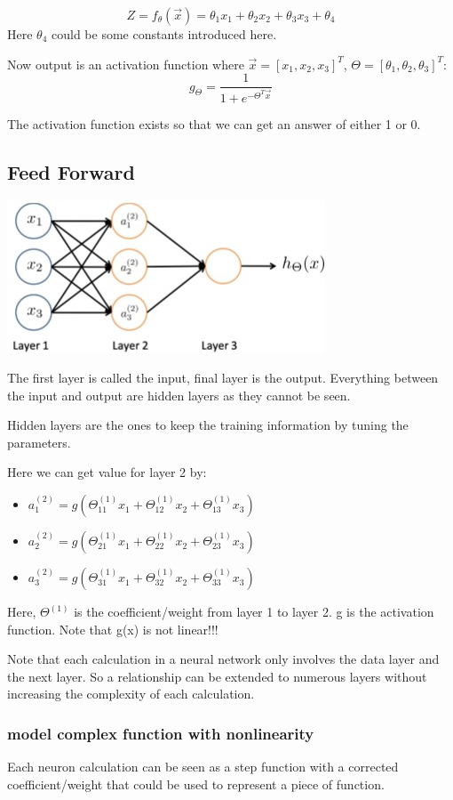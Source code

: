 \documentclass[letterpaper,12pt]{article}
\begin{document}
\[Z=f_\theta(\vec{x})=\theta_1 x_1 + \theta_2 x_2 + \theta_3 x_3 + \theta_4\]
Here $\theta_4$ could be some constants introduced here. 

Now output is an activation function where $\vec{x}=[x_1,x_2,x_3]^T$, $\Theta=[\theta_1,\theta_2, \theta_3]^T$:
\[g_\Theta=\frac{1}{1+e^{-\Theta^T \vec{x}}}\]

The activation function exists so that we can get an answer of either 1 or 0. 

\subsection{Feed Forward}
\includegraphics*{./Image/Feed Forward Nonliearity.jpg}

The first layer is called the input, final layer is the output. Everything between the input and output are hidden layers as they cannot be seen.

Hidden layers are the ones to keep the training information by tuning the parameters. 

Here we can get value for layer 2 by:
\begin{itemize}
    \item $a_1^{(2)} = g(\Theta_{11}^{(1)}x_1+\Theta_{12}^{(1)}x_2+\Theta_{13}^{(1)}x_3)$
    \item $a_2^{(2)} = g(\Theta_{21}^{(1)}x_1+\Theta_{22}^{(1)}x_2+\Theta_{23}^{(1)}x_3)$
    \item $a_3^{(2)} = g(\Theta_{31}^{(1)}x_1+\Theta_{32}^{(1)}x_2+\Theta_{33}^{(1)}x_3)$
\end{itemize}

Here, $\Theta^{(1)}$ is the coefficient/weight from layer 1 to layer 2. g is the activation function. Note that g(x) is not linear!!!

Note that each calculation in a neural network only involves the data layer and the next layer. So a relationship can be extended to numerous layers without increasing the complexity of each calculation. 

\subsubsection{model complex function with non\-linearity}
Each neuron calculation can be seen as a step function with a corrected coefficient/weight that could be used to represent a piece of function.
\end{document}
